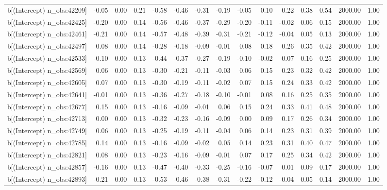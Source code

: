 \begin{table}[ht]
\begin{tabular}{rrrrrrrrrrrrrrr}
  b[(Intercept) n\_obs:42209] & -0.05 & 0.00 & 0.21 & -0.58 & -0.46 & -0.31 & -0.19 & -0.05 & 0.10 & 0.22 & 0.38 & 0.54 & 2000.00 & 1.00 \\ 
  b[(Intercept) n\_obs:42425] & -0.20 & 0.00 & 0.14 & -0.56 & -0.46 & -0.37 & -0.29 & -0.20 & -0.11 & -0.02 & 0.06 & 0.15 & 2000.00 & 1.00 \\ 
  b[(Intercept) n\_obs:42461] & -0.21 & 0.00 & 0.14 & -0.57 & -0.48 & -0.39 & -0.31 & -0.21 & -0.12 & -0.04 & 0.05 & 0.13 & 2000.00 & 1.00 \\ 
  b[(Intercept) n\_obs:42497] & 0.08 & 0.00 & 0.14 & -0.28 & -0.18 & -0.09 & -0.01 & 0.08 & 0.18 & 0.26 & 0.35 & 0.42 & 2000.00 & 1.00 \\ 
  b[(Intercept) n\_obs:42533] & -0.10 & 0.00 & 0.13 & -0.44 & -0.37 & -0.27 & -0.19 & -0.10 & -0.02 & 0.07 & 0.16 & 0.25 & 2000.00 & 1.00 \\ 
  b[(Intercept) n\_obs:42569] & 0.06 & 0.00 & 0.13 & -0.30 & -0.21 & -0.11 & -0.03 & 0.06 & 0.15 & 0.23 & 0.32 & 0.42 & 2000.00 & 1.00 \\ 
  b[(Intercept) n\_obs:42605] & 0.07 & 0.00 & 0.13 & -0.30 & -0.19 & -0.11 & -0.02 & 0.07 & 0.15 & 0.24 & 0.33 & 0.42 & 2000.00 & 1.00 \\ 
  b[(Intercept) n\_obs:42641] & -0.01 & 0.00 & 0.13 & -0.36 & -0.27 & -0.18 & -0.10 & -0.01 & 0.08 & 0.16 & 0.25 & 0.35 & 2000.00 & 1.00 \\ 
  b[(Intercept) n\_obs:42677] & 0.15 & 0.00 & 0.13 & -0.16 & -0.09 & -0.01 & 0.06 & 0.15 & 0.24 & 0.33 & 0.41 & 0.48 & 2000.00 & 1.00 \\ 
  b[(Intercept) n\_obs:42713] & 0.00 & 0.00 & 0.13 & -0.32 & -0.23 & -0.16 & -0.09 & 0.00 & 0.09 & 0.17 & 0.26 & 0.34 & 2000.00 & 1.00 \\ 
  b[(Intercept) n\_obs:42749] & 0.06 & 0.00 & 0.13 & -0.25 & -0.19 & -0.11 & -0.04 & 0.06 & 0.14 & 0.23 & 0.31 & 0.39 & 2000.00 & 1.00 \\ 
  b[(Intercept) n\_obs:42785] & 0.14 & 0.00 & 0.13 & -0.16 & -0.09 & -0.02 & 0.05 & 0.14 & 0.23 & 0.31 & 0.40 & 0.47 & 2000.00 & 1.00 \\ 
  b[(Intercept) n\_obs:42821] & 0.08 & 0.00 & 0.13 & -0.23 & -0.16 & -0.09 & -0.01 & 0.07 & 0.17 & 0.25 & 0.34 & 0.42 & 2000.00 & 1.00 \\ 
  b[(Intercept) n\_obs:42857] & -0.16 & 0.00 & 0.13 & -0.47 & -0.40 & -0.33 & -0.25 & -0.16 & -0.07 & 0.01 & 0.09 & 0.17 & 2000.00 & 1.00 \\ 
  b[(Intercept) n\_obs:42893] & -0.21 & 0.00 & 0.13 & -0.53 & -0.46 & -0.38 & -0.31 & -0.22 & -0.12 & -0.04 & 0.05 & 0.14 & 2000.00 & 1.00 \\ 

\end{tabular}
\end{table}
